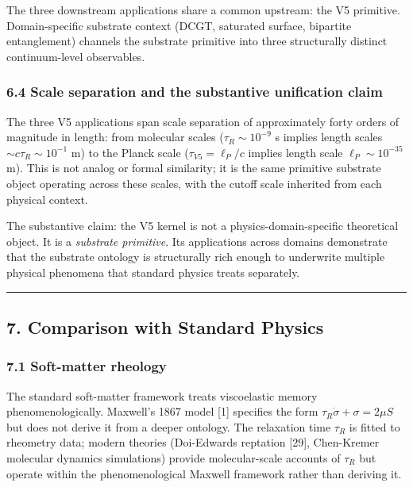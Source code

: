 \documentclass[
  11pt,
  a4paperpaper,
]{article}
\begin{document}
The three downstream applications share a common upstream: the V5
primitive. Domain-specific substrate context (DCGT, saturated surface,
bipartite entanglement) channels the substrate primitive into three
structurally distinct continuum-level observables.

\subsubsection{6.4 Scale separation and the substantive unification
claim}\label{scale-separation-and-the-substantive-unification-claim}

The three V5 applications span scale separation of approximately forty
orders of magnitude in length: from molecular scales
(\(\tau_R \sim 10^{-9}\) s implies length scales
\(\sim c\tau_R \sim 10^{-1}\) m) to the Planck scale
(\(\tau_{V5} = \ell_P/c\) implies length scale \(\ell_P \sim 10^{-35}\)
m). This is not analog or formal similarity; it is the same primitive
substrate object operating across these scales, with the cutoff scale
inherited from each physical context.

The substantive claim: the V5 kernel is not a physics-domain-specific
theoretical object. It is a \emph{substrate primitive}. Its applications
across domains demonstrate that the substrate ontology is structurally
rich enough to underwrite multiple physical phenomena that standard
physics treats separately.

\begin{center}\rule{0.5\linewidth}{0.5pt}\end{center}

\subsection{7. Comparison with Standard
Physics}\label{comparison-with-standard-physics}

\subsubsection{7.1 Soft-matter rheology}\label{soft-matter-rheology}

The standard soft-matter framework treats viscoelastic memory
phenomenologically. Maxwell's 1867 model {[}1{]} specifies the form
\(\tau_R \dot\sigma + \sigma = 2\mu S\) but does not derive it from a
deeper ontology. The relaxation time \(\tau_R\) is fitted to rheometry
data; modern theories (Doi-Edwards reptation {[}29{]}, Chen-Kremer
molecular dynamics simulations) provide molecular-scale accounts of
\(\tau_R\) but operate within the phenomenological Maxwell framework
rather than deriving it.
\end{document}
